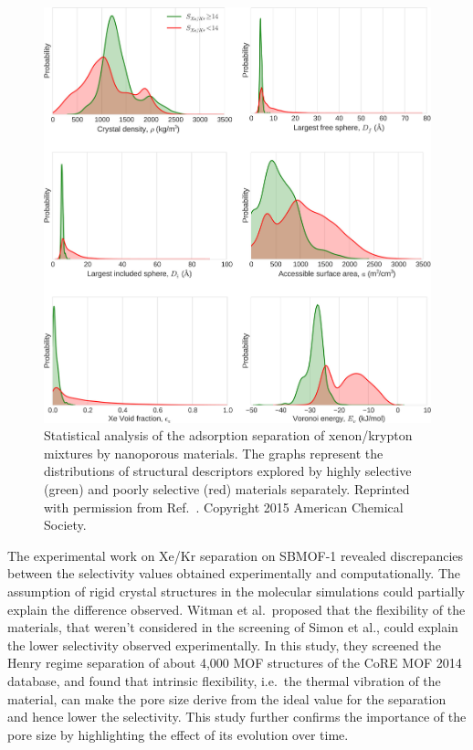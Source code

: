 \documentclass[main.tex]{subfiles}
\begin{document}
\begin{figure}[ht]
\centering
  \includegraphics[width=0.7\linewidth]{figures/1-screening/Simon_2015_descriptors.jpeg}
  \caption{Statistical analysis of the adsorption separation of xenon/krypton mixtures by nanoporous materials. The graphs represent the distributions of structural descriptors explored by highly selective (green) and poorly selective (red) materials separately. Reprinted with permission from Ref.~. Copyright 2015 American Chemical Society.}
  \label{fgr:Simon2015}
\end{figure}

The experimental work on Xe/Kr separation on SBMOF-1 revealed discrepancies between the selectivity values obtained experimentally and computationally.\cite{Banerjee_2016} {The assumption of rigid crystal structures in the molecular simulations could partially explain the difference observed.} Witman et al.\ proposed that the flexibility of the materials, that weren't considered in the screening of Simon et al., could explain the lower selectivity observed experimentally.\cite{Witman_2017} In this study, they screened the Henry regime separation of about 4,000 MOF structures of the CoRE MOF 2014 database\cite{Chung_2014}, and found that intrinsic flexibility, i.e.\ the thermal vibration of the material, can make the pore size derive from the ideal value for the separation and hence lower the selectivity. This study further confirms the importance of the pore size by highlighting the effect of its evolution over time.
\end{document}
